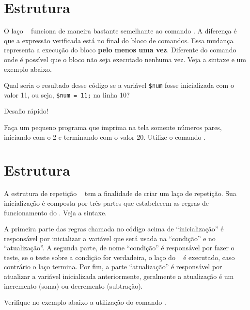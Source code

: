 \section{Estrutura \comandodowhile}
\label{estrutura-do-while}

O laço \comandodowhile~ funciona de maneira bastante semelhante ao comando \comandowhile.
A diferença é que a expressão verificada está no final do bloco de comandos. Essa mudança
representa a execução do bloco \textbf{pelo menos uma vez}. Diferente do comando \comandowhile
onde é possível que o bloco não seja executado nenhuma vez. Veja a sintaxe e um exemplo
abaixo.



Qual seria o resultado desse código se a variável \texttt{\$num} fosse inicializada com o valor
11, ou seja, \texttt{\$num = 11;} na linha 10?

{\Large Desafio rápido!}

Faça um pequeno programa que imprima na tela somente números pares, iniciando com o 2
e terminando com o valor 20. Utilize o comando \comandodowhile. 

\section{Estrutura \comandofor}

A estrutura de repetição \comandofor~ tem a finalidade de criar um laço de repetição.
Sua inicialização é composta por três partes que estabelecem as regras
de funcionamento do \comandofor. Veja a sintaxe.



A primeira parte das regras chamada no código acima de ``inicialização'' é responsável
por inicializar a variável que será usada na ``condição'' e no ``atualização''. A 
segunda parte, de nome ``condição'' é responsável por fazer o teste, se o teste sobre
a condição for verdadeira, o laço do \comandofor~ é executado, caso contrário
o laço termina. Por fim, a parte ``atualização'' é responsável por atualizar a variável
inicializada anteriormente, geralmente a atualização é um incremento (soma) ou 
decremento (subtração).

Verifique no exemplo abaixo a utilização do comando \comandofor.



